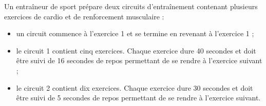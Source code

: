 \documentclass[a4paper,12pt]{article}
\begin{document}
Un entraîneur de sport prépare deux circuits d'entraînement contenant plusieurs exercices de cardio et de renforcement musculaire :

\begin{itemize}[label=\textbullet, itemsep=2pt]
  \item un circuit commence à l'exercice 1 et se termine en revenant à l'exercice 1 ;
  \item le circuit 1 contient cinq exercices. Chaque exercice dure 40 secondes et doit être suivi de 16 secondes de repos permettant de se rendre à l'exercice suivant ;
  \item le circuit 2 contient dix exercices. Chaque exercice dure 30 secondes et doit être suivi de 5 secondes de repos permettant de se rendre à l'exercice suivant.
\end{itemize}

\begin{center}
\hfill
{}
\end{center}
\end{document}
